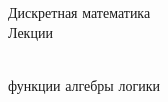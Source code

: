 \documentclass[a4paper]{article}
\begin{document}
    \begin{center} 
        \LARGE Дискретная математика\\
        \LARGE Лекции\\
    \end{center}
    \newpage
    \begin{center}
        \\
         функции алгебры логики
    \end{center}
\end{document}
